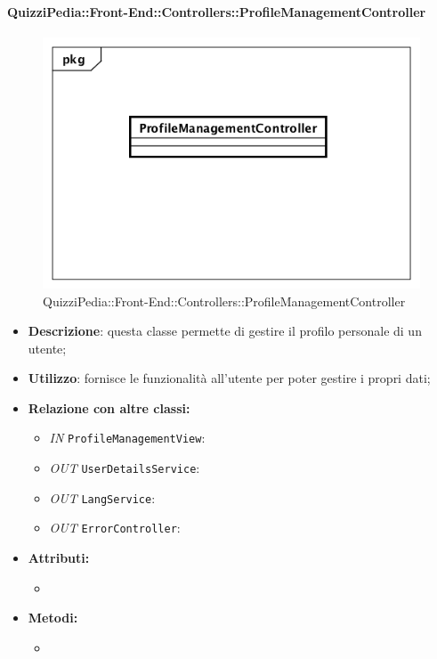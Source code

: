 \paragraph{QuizziPedia::Front-End::Controllers::ProfileManagementController}
\begin{figure}
	\centering
	\includegraphics[scale=0.45]{UML/Classi/Front-End/QuizziPedia_Front-end_Controller_ProfileManagementController.png}
	\caption{QuizziPedia::Front-End::Controllers::ProfileManagementController}
\end{figure}
\begin{itemize}
	\item \textbf{Descrizione}: questa classe permette di gestire il profilo personale di un utente; 
	\item \textbf{Utilizzo}: fornisce le funzionalità all'utente per poter gestire i propri dati;
	\item \textbf{Relazione con altre classi:}
	\begin{itemize}
		\item \textit{IN} \texttt{ProfileManagementView}:  
		\item \textit{OUT} \texttt{UserDetailsService}: 
		\item \textit{OUT} \texttt{LangService}: 
		\item \textit{OUT} \texttt{ErrorController}: 
	\end{itemize}
	\item \textbf{Attributi:}
	\begin{itemize}
		\item 
	\end{itemize}
	\item \textbf{Metodi:}
	\begin{itemize}
		\item 
	\end{itemize}
\end{itemize}

